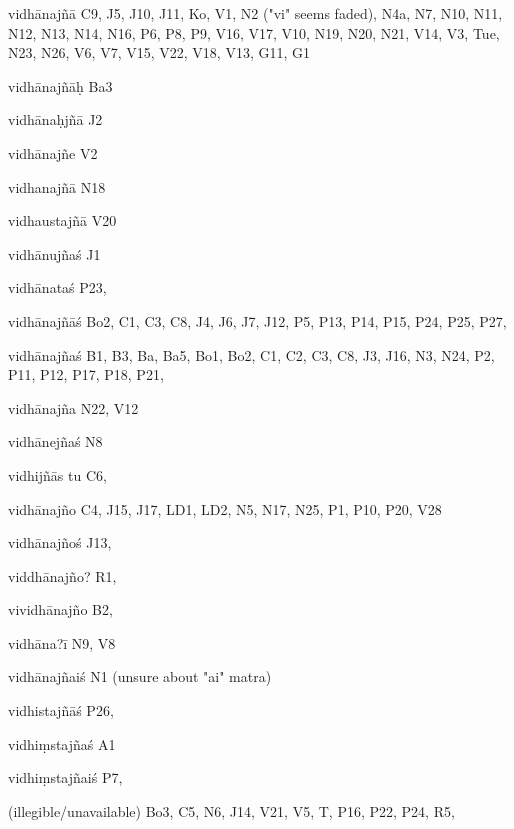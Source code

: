 \begin{ekdosis}
\begin{marma}[hp01_055]
\begin{marma}[hp02_009]
\begin{marma}[hp02_011]
 \begin{marma}[hp02_43a]
\item[vidhānajñā] C9, J5, J10, J11, Ko, V1, N2 ("vi" seems faded), N4a, N7, N10, N11, N12, N13, N14, N16, P6, P8, P9, V16, V17, V10, N19, N20, N21, V14, V3, Tue, N23, N26, V6, V7, V15, V22, V18, V13, G11, G1
\item[vidhānajñāḥ] Ba3
\item[vidhānaḥjñā] J2
\item[vidhānajñe] V2
\item[vidhanajñā] N18
\item[vidhaustajñā] V20
\item[vidhānujñaś] J1
\item[vidhānataś] P23, 
\item[vidhānajñāś] Bo2, C1, C3, C8, J4, J6, J7, J12, P5, P13, P14, P15, P24, P25, P27, 
\item[vidhānajñaś] B1, B3, Ba, Ba5, Bo1, Bo2, C1, C2, C3, C8, J3, J16, N3, N24, P2, P11, P12, P17, P18, P21, 
\item[vidhānajña] N22, V12
\item[vidhānejñaś] N8
\item[vidhijñās tu] C6,
\item[vidhānajño] C4, J15, J17, LD1, LD2, N5, N17, N25, P1, P10, P20, V28
\item[vidhānajñoś] J13, 
\item[viddhānajño?] R1,
\item[vividhānajño] B2, 
\item[vidhāna?ī] N9, V8
\item[vidhānajñaiś] N1 (unsure about "ai" matra)
\item[vidhistajñāś] P26,
\item[vidhiṃstajñaś] A1
\item[vidhiṃstajñaiś] P7,
\item[(illegible/unavailable)] Bo3, C5, N6, J14, V21, V5, T, P16, P22, P24, R5,
  \begin{description}

    \end{description}
 \end{marma}


\end{marma}
\end{marma}
\end{marma}
\end{ekdosis}
